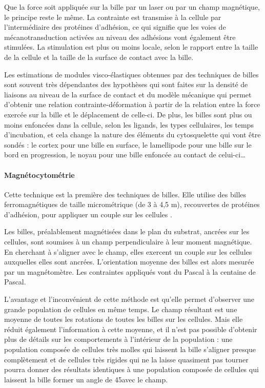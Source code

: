 Que la force soit appliquée sur la bille par un laser ou par un champ magnétique, le principe reste le même. La contrainte est transmise à la cellule par l'intermédiaire des protéines d'adhésion, ce qui signifie que les voies de mécanotransduction activées au niveau des adhésions vont également être stimulées. 
La stimulation est plus ou moins locale, selon le rapport entre la taille de la cellule et la taille de la surface de contact avec la bille.

Les estimations de modules visco-élastiques obtenues par des techniques de billes sont souvent très dépendantes des hypothèses qui sont faites sur la densité de liaisons au niveau de la surface de contact et du modèle mécanique qui permet d'obtenir une relation contrainte-déformation à partir de la relation entre la force exercée sur la bille et le déplacement de celle-ci. 
De plus, les billes sont plus ou moins enfoncées dans la cellule, selon les ligands, les types cellulaires, les temps d'incubation, et cela change la nature des éléments du cytosquelette qui vont être sondés : le cortex pour une bille en surface, le lamellipode pour une bille sur le bord en progression, le noyau pour une bille enfoncée au contact de celui-ci\dots


\paragraph{Magnétocytométrie}

Cette technique est la première des techniques de billes. Elle utilise des billes ferromagnétiques de taille micrométrique (de 3 à 4,5 \micro m), recouvertes de protéines d'adhésion, pour appliquer un couple sur les cellules \parencite{wang_mechanotransduction_1993}.

Les billes, préalablement magnétisées dans le plan du substrat, ancrées sur les cellules, sont soumises à un champ perpendiculaire à leur moment magnétique. En cherchant à s'aligner avec le champ, elles exercent un couple sur les cellules auxquelles elles sont ancrées. L'orientation moyenne des billes est alors mesurée par un magnétomètre. Les contraintes appliqués vont du Pascal à la centaine de Pascal. 

L'avantage et l'inconvénient de cette méthode est qu'elle permet d'observer une grande population de cellules en même temps. Le champ résultant est une moyenne de toutes les rotations de toutes les billes sur les cellules. Mais elle réduit également l'information à cette moyenne, et il n'est pas possible d'obtenir plus de détails sur les comportements à l'intérieur de la population : une population composée de cellules très molles qui laissent la bille s'aligner presque complètement et de cellules très rigides qui ne la laisse quasiment pas tourner pourra donner des résultats identiques à une population composée de cellules qui laissent la bille former un angle de 45\degres avec le champ. 

